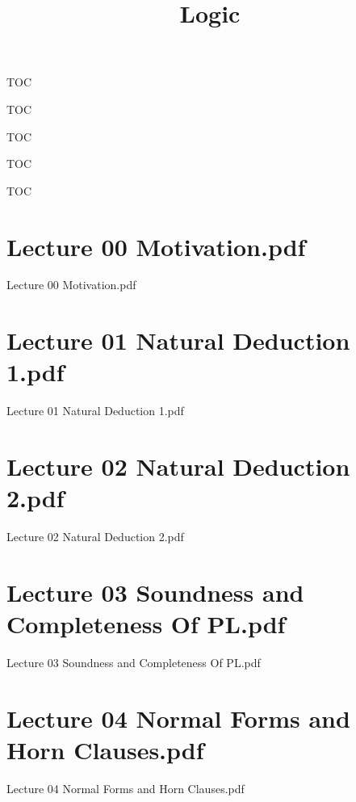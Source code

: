 \documentclass[aspectratio = 43]{beamer}
\title{Logic}
\begin{document}
\maketitle
\begin{frame}{TOC}
\tableofcontents[sections=1-8]
\end{frame}
\begin{frame}{TOC}
\tableofcontents[sections=9-16]
\end{frame}
\begin{frame}{TOC}
\tableofcontents[sections=17-24]
\end{frame}
\begin{frame}{TOC}
\tableofcontents[sections=25-32]
\end{frame}
\begin{frame}{TOC}
\tableofcontents[sections=33-34]
\end{frame}
\section{Lecture 00 Motivation.pdf}
\begin{frame}{Lecture 00 Motivation.pdf}
\end{frame}

\section{Lecture 01 Natural Deduction 1.pdf}
\begin{frame}{Lecture 01 Natural Deduction 1.pdf}
\end{frame}

\section{Lecture 02 Natural Deduction 2.pdf}
\begin{frame}{Lecture 02 Natural Deduction 2.pdf}
\end{frame}

\section{Lecture 03 Soundness and Completeness Of PL.pdf}
\begin{frame}{Lecture 03 Soundness and Completeness Of PL.pdf}
\end{frame}

\section{Lecture 04 Normal Forms and Horn Clauses.pdf}
\begin{frame}{Lecture 04 Normal Forms and Horn Clauses.pdf}
\end{frame}

\end{document}
